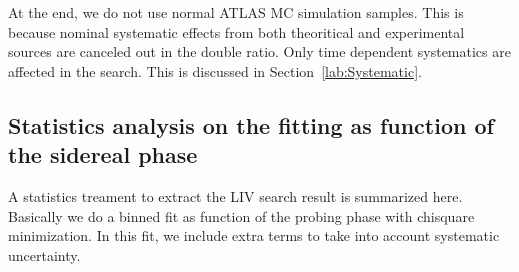 At the end, we do not use normal ATLAS MC simulation samples. 
This is because nominal systematic effects from both theoritical and experimental sources are canceled out in the double ratio. 
Only time dependent systematics are affected in the search. This is discussed in Section~\ref{lab:Systematic}.


\subsection{Statistics analysis on the fitting as function of the sidereal phase}

A statistics treament to extract the LIV search result is summarized here. 
Basically we do a binned fit as function of the probing phase with chisquare minimization. 
In this fit, we include extra terms to take into account systematic uncertainty. 



